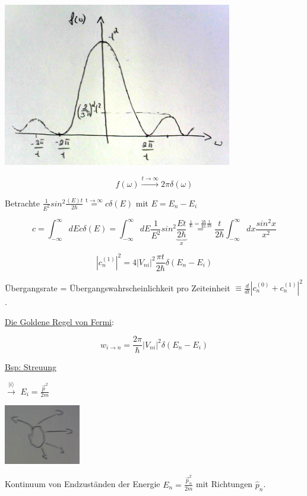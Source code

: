 \includegraphics[width=0.75\textwidth]{kap03_07.png}



 \[f(\omega) \xrightarrow{t\rightarrow \infty} 2\pi\delta(\omega)\]



Betrachte \(\frac{1}{E^2}sin^2 \frac{(E)t}{2\hbar} \stackrel{\mathrm{t\rightarrow \infty}}= c\delta(E)\) mit \(E = E_n-E_i\)

\[ c = \int_{-\infty}^{\infty} dE c\delta(E) = \int_{-\infty}^{\infty} dE \frac{1}{E^2}sin^2\frac{Et}{\underbrace{2\hbar}_{x}} \stackrel{\mathrm{\frac{1}{E}=\frac{2\hbar}{Et}\frac{t}{2\hbar} }}= \frac{t}{2\hbar} \int_{-\infty}^{\infty} dx \frac{sin^2 x}{x^2} \]

\[ |c^{(1)}_n|^2 = 4|V_{ni}|^2 \frac{\pi t}{2\hbar} \delta(E_n-E_i) \]

Übergangsrate = Übergangswahrscheinlichkeit pro Zeiteinheit \(\equiv \frac{d}{dt}|c^{(0)}_n+c^{(1)}_n|^2\) . 

\underline{Die Goldene Regel von Fermi}:

\[\boxed{w_{i\rightarrow n} = \frac{2\pi}{\hbar} |V_{ni}|^2 \delta(E_n-E_i)}\]


\underline{Bsp: Streuung}

\(\xrightarrow{|i\rangle }\) \(E_i = \frac{\vec p^2}{2m}\)

\includegraphics[width=0.25\textwidth]{kap03_08.png}

Kontinuum von Endzuständen der Energie \(E_n = \frac{\vec p^2_n}{2m}\) mit Richtungen \(\hat p_n\).

